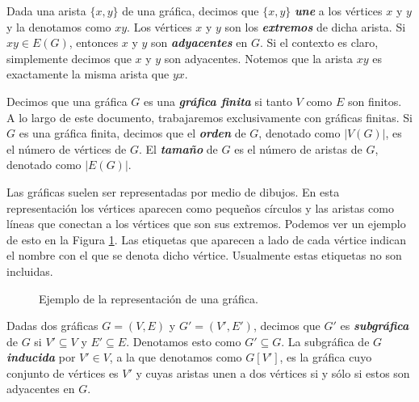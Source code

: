 Dada una arista $\{x,y\}$ de una gráfica, decimos que $\{x,y\}$ \textbf{\emph{une}} a los vértices $x$ y $y$ y la denotamos como $xy$. Los vértices $x$ y $y$ son los \textbf{\emph{extremos}} de dicha arista. Si $xy \in E(G)$, entonces $x$ y $y$ son \textbf{\emph{adyacentes}} en $G$. Si el contexto es claro, simplemente decimos que $x$ y $y$ son adyacentes. Notemos que la arista $xy$ es exactamente la misma arista que $yx$.

Decimos que una gráfica $G$ es una \textbf{\textit{gráfica finita}} si tanto $V$ como $E$ son finitos. A lo largo de este documento, trabajaremos exclusivamente con gráficas finitas. Si $G$ es una gráfica finita, decimos que el \textbf{\emph{orden}} de $G$, denotado como $|V(G)|$, es el número de vértices de $G$. El \textbf{\emph{tamaño}} de $G$ es el número de aristas de $G$, denotado como $|E(G)|$.

Las gráficas suelen ser representadas por medio de dibujos. En esta representación los vértices aparecen como pequeños círculos y las aristas como líneas que conectan a los vértices que son sus extremos. Podemos ver un ejemplo de esto en la Figura \ref{fig_ejemplo_graph}. Las etiquetas que aparecen a lado de cada vértice indican el nombre con el que se denota dicho vértice. Usualmente estas etiquetas no son incluidas.

\begin{figure}[ht!]
\begin{center}
\end{center}
\caption{Ejemplo de la representación de una gráfica.}\label{fig_ejemplo_graph}
\end{figure}

Dadas dos gráficas $G=(V,E)$ y $G'=(V',E')$, decimos que $G'$ es \textbf{\emph{subgráfica}} de $G$ si $V' \subseteq V$ y $E' \subseteq E$. Denotamos esto como $G' \subseteq G$. La subgráfica de $G$ \emph{\textbf{inducida}} por $V'\in V$, a la que denotamos como $G[V']$, es la gráfica cuyo conjunto de vértices es $V'$ y cuyas aristas unen a dos vértices si y sólo si estos son adyacentes en $G$.

